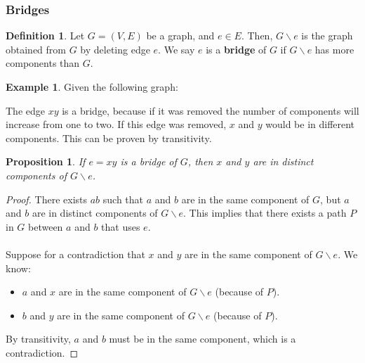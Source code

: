 \documentclass[]{article}
\newtheorem*{proposition}{Proposition}
\theoremstyle{definition}
\newtheorem*{defn}{Definition}
\newtheorem{ex}{Example}[section]
\newcommand{\lecture}[1]{\marginpar{{\footnotesize $\leftarrow$ \underline{#1}}}}
\begin{document}
			\subsubsection{Bridges}
				\begin{defn}
					Let $G = (V, E)$ be a graph, and $e \in E$. Then, $G \backslash e$ is the graph obtained from $G$ by deleting edge $e$. We say $e$ is a \textbf{bridge} of $G$ if $G \backslash e$ has more components than $G$.
				\end{defn}

				\begin{ex}
					Given the following graph:
					\begin{center}
					\end{center}

					The edge $xy$ is a bridge, because if it was removed the number of components will increase from one to two. If this edge was removed, $x$ and $y$ would be in different components. This can be proven by transitivity.
				\end{ex}


				\begin{proposition} \lecture{March 6, 2013}
					If $e = xy$ is a bridge of $G$, then $x$ and $y$ are in distinct components of $G \backslash e$.
				\end{proposition}

				\begin{proof}
					There exists $ab$ such that $a$ and $b$ are in the same component of $G$, but $a$ and $b$ are in distinct components of $G \backslash e$. This implies that there exists a path $P$ in $G$ between $a$ and $b$ that uses $e$.
					\\ \\
					Suppose for a contradiction that $x$ and $y$ are in the same component of $G \backslash e$. We know:
					\begin{itemize}
						\item $a$ and $x$ are in the same component of $G \backslash e$ (because of $P$).
						\item $b$ and $y$ are in the same component of $G \backslash e$ (because of $P$).
					\end{itemize}

					By transitivity, $a$ and $b$ must be in the same component, which is a contradiction.
				\end{proof}
\end{document}
